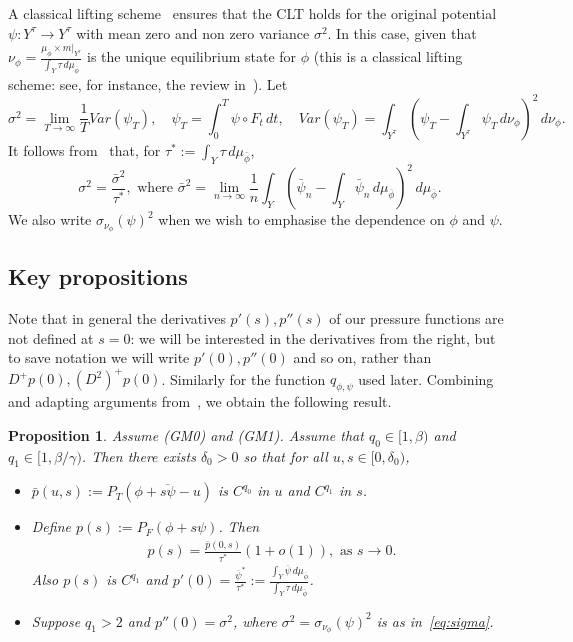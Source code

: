 \documentclass[12pt]{article}
\numberwithin{equation}{section}
\newtheorem{prop}[thm]{Proposition}
\newcommand{\F}{F}
\begin{document}
A classical lifting scheme~\cite{MT04}
ensures that the CLT holds for the original potential
$\psi:Y^\tau\to Y^\tau$ with mean zero and non zero variance $\sigma^2$.
In this case, given that 
$\nu_{\phi}=\frac{\mu_{\overline{\phi}}\times m|_{Y^\tau}}{\int_Y\tau\,d\mu_{\overline{\phi}}}$ 
is the unique equilibrium state for $\phi$ (this is a classical lifting scheme: see, for  instance, 
the review in~\cite[Section 3]{BruTerTod21}). 
Let 
\begin{equation*}
 \sigma^2 = \lim_{T\to\infty}\frac{1}{T}Var(\psi_T),\quad \psi_T=\int_{0}^T\psi\circ \F_t\, dt,\quad Var(\psi_T)=\int_{Y^\tau}\left(\psi_T-\int_{Y^\tau}\psi_T\, d\nu_{\phi}\right)^2\, d\nu_{\phi}.
\end{equation*}
It follows from~\cite{MT04} that, for $\tau^* := \int_Y \tau \, d\mu_{\bar \phi}$,
\begin{equation}\label{eq:sigma}
 \sigma^2=\frac{\bar\sigma^2}{\tau^*},
 \text{ where }\bar\sigma^2=\lim_{n\to\infty}\frac{1}{n}\int_Y \left(\bar\psi_n-\int_Y \bar\psi_n\,d\mu_{\overline{\phi}}\right)^2\,d\mu_{\overline{\phi}}.
 \end{equation}
 We also write $\sigma_{\nu_\phi}(\psi)^2$ when we wish to emphasise the dependence on $\phi$ and $\psi$.


\subsection{Key propositions}
  Note that in general the derivatives $p'(s), p''(s)$ of our pressure functions are not defined at $s=0$: we will be interested in the derivatives from the right,  but to save notation we will write $p'(0), p''(0)$ and so on, rather than $D^+p(0), (D^2)^+p(0)$.  Similarly for the function $q_{\phi, \psi}$ used later.
Combining and adapting arguments from~\cite{BruTerTod19, BruTerTod21, MelTer17},
we obtain the following result.

\begin{prop}\label{prop:gm}
 Assume (GM0) and (GM1).  Assume that $q_0\in [1,\beta)$ and $q_1\in [1,\beta/\gamma)$.
 Then there exists $\delta_0>0$ so that for all $u,s\in [0,\delta_0)$,
 
 \begin{itemize}
  \item[(i)] 
   $\bar p(u,s):=P_{T}(\overline{\phi+s\psi-u})$ is $C^{q_0}$ in $u$
   and 
   $C^{q_1}$ in $s$.
  \item[(ii)] Define $p(s):=P_{\F}(\phi+s\psi)$. Then
  \begin{align*}
  p(s)=\frac{\bar p(0,s)}{\tau^*}(1+o(1)), \text{ as } s\to 0.
  \end{align*}
  Also $p(s)$ is $C^{q_1}$ and
   $p'(0)=\frac{\overline{\psi}^*}{\tau^*}:=\frac{\int_Y\overline{\psi}\, d\mu_{\bar\phi}}{\int_Y\tau\, d\mu_{\bar\phi}}$.
   
  \item[(iii)] Suppose $q_1>2$ and $p''(0)=\sigma^2$, where $\sigma^2=\sigma_{\nu_\phi}(\psi)^2$ is as in~\eqref{eq:sigma}.
  
  \end{itemize}
\end{prop}
\end{document}
